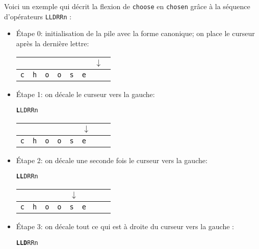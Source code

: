 \bigskip
\noindent Voici un exemple qui décrit la flexion de \verb+choose+ en \verb+chosen+
      grâce à la séquence d’opérateurs \verb+LLDRRn+ :
\begin{itemize}
  \item Étape 0: initialisation de la pile avec la forme canonique; on place le curseur après la
  	  dernière lettre:

\begin{center}
\begin{tabular}{|l|l|l|l|l|l|l|l}
\multicolumn{6}{l}{} & \multicolumn{2}{l}{$\downarrow$} \\
\hline
\verb+c+ & \verb+h+ & \verb+o+ & \verb+o+ & \verb+s+ & \verb+e+ & \verb+ + & \\
\hline
\end{tabular}
\end{center}

\bigskip
\item Étape 1: on décale le curseur vers la gauche:

\begin{center}
\texttt{\textbf{L}LDRRn}

\begin{tabular}{|l|l|l|l|l|l|l|l}
\multicolumn{5}{l}{} & \multicolumn{3}{l}{$\downarrow$} \\
\hline
\verb+c+ & \verb+h+ & \verb+o+ & \verb+o+ & \verb+s+ & \verb+e+ & \verb+ + & \\
\hline
\end{tabular}
\end{center}

\bigskip
\item Étape 2: on décale une seconde fois le curseur vers la gauche:

\begin{center}
\texttt{\textbf{LL}DRRn}

\begin{tabular}{|l|l|l|l|l|l|l|l}
\multicolumn{4}{l}{} & \multicolumn{4}{l}{$\downarrow$} \\
\hline
\verb+c+ & \verb+h+ & \verb+o+ & \verb+o+ & \verb+s+ & \verb+e+ & \verb+ + & \\
\hline
\end{tabular}
\end{center}

\bigskip \item Étape 3: on décale tout ce qui est à droite du curseur vers la gauche :

\begin{center}
\texttt{\textbf{LLD}RRn}


\end{center}
\end{itemize}
